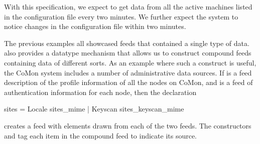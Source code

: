 With this specification, we
expect to get data from all the active machines listed in the
configuration file every two minutes.  We further expect the system to
notice changes in the configuration file within two minutes.

The previous examples all showcased feeds that contained a single type
of data.  \padsd{} also provides a datatype mechanism that allows us
to construct compound feeds containing data of different sorts.  
As an example where such a construct is useful, the CoMon system includes a
number of administrative data sources.  
If  is a feed description of the profile
information of all the nodes on CoMon, and  is 
a feed of authentication information for each node, then the declaration
%
\begin{code}
 sites = 
    Locale  sites_mime
  | Keyscan  sites_keyscan_mime
\end{code}
%
creates a feed with elements drawn from each of the two 
feeds.  The constructors  and  tag each item in
the compound feed to indicate its source. 



